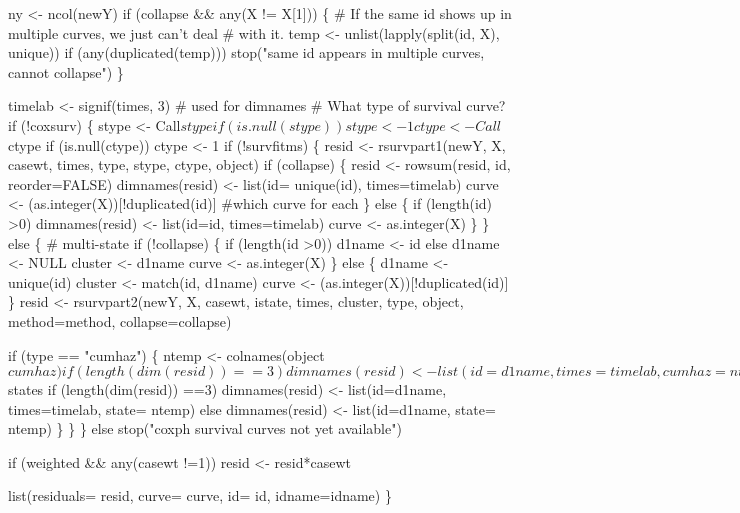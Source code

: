 \documentclass{article}
\begin{document}
\begin{nwchunk}
     ny <- ncol(newY)
     if (collapse && any(X != X[1])) \{
         # If the same id shows up in multiple curves, we just can't deal
         #  with it.
         temp <- unlist(lapply(split(id, X), unique))
         if (any(duplicated(temp)))
             stop("same id appears in multiple curves, cannot collapse")
     \}
     
     timelab <- signif(times, 3)  # used for dimnames
     # What type of survival curve?
     if (!coxsurv) \{
         stype <- Call$stype
         if (is.null(stype)) stype <- 1
         ctype <- Call$ctype
         if (is.null(ctype)) ctype <- 1
         if (!survfitms) \{
             resid <- rsurvpart1(newY, X, casewt, times,
                                 type, stype, ctype, object)
             if (collapse) \{
                 resid <- rowsum(resid, id, reorder=FALSE)
                 dimnames(resid) <- list(id= unique(id), times=timelab)
                 curve <- (as.integer(X))[!duplicated(id)] #which curve for each
             \} 
             else \{
                 if (length(id) >0) dimnames(resid) <- list(id=id, times=timelab)
                 curve <- as.integer(X)
             \}
         \}
         else \{  # multi-state
             if (!collapse) \{
                 if (length(id >0)) d1name <- id else d1name <- NULL
                 cluster <- d1name
                 curve <- as.integer(X)
             \}       
             else \{
                 d1name <- unique(id)
                 cluster <- match(id, d1name)
                 curve <- (as.integer(X))[!duplicated(id)]
             \}
             resid <- rsurvpart2(newY, X, casewt, istate, times, cluster,
                                 type, object, method=method, collapse=collapse)
 
             if (type == "cumhaz") \{
                 ntemp <- colnames(object$cumhaz)
                 if (length(dim(resid)) ==3)
                      dimnames(resid) <- list(id=d1name, times=timelab, 
                                              cumhaz= ntemp)
                 else dimnames(resid) <- list(id=d1name, cumhaz=ntemp)
             \}
             else \{
                 ntemp <- object$states
                 if (length(dim(resid)) ==3) 
                     dimnames(resid) <- list(id=d1name, times=timelab, 
                                             state= ntemp)
                 else dimnames(resid) <- list(id=d1name, state= ntemp)
             \}
         \}
     \}
     else stop("coxph survival curves not yet available")
 
     if (weighted && any(casewt !=1)) resid <- resid*casewt
 
     list(residuals= resid, curve= curve, id= id, idname=idname)
 \}
\end{nwchunk}
\end{document}
